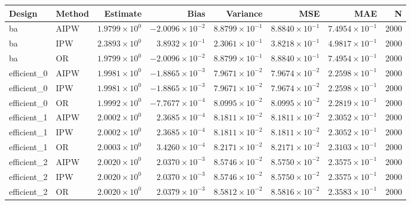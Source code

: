 \begin{table}[ht]
\centering
\begin{tabular}{llrrrrrr}
  \toprule
Design & Method & Estimate & Bias & Variance & MSE & MAE & N \\ 
  \midrule
ba & AIPW & $1.9799 \times 10^{0}$ & $-2.0096 \times 10^{-2}$ & $8.8799 \times 10^{-1}$ & $8.8840 \times 10^{-1}$ & $7.4954 \times 10^{-1}$ & 2000 \\ 
  ba & IPW & $2.3893 \times 10^{0}$ & $3.8932 \times 10^{-1}$ & $2.3061 \times 10^{-1}$ & $3.8218 \times 10^{-1}$ & $4.9817 \times 10^{-1}$ & 2000 \\ 
  ba & OR & $1.9799 \times 10^{0}$ & $-2.0096 \times 10^{-2}$ & $8.8799 \times 10^{-1}$ & $8.8840 \times 10^{-1}$ & $7.4954 \times 10^{-1}$ & 2000 \\ 
   \midrule
efficient\_0 & AIPW & $1.9981 \times 10^{0}$ & $-1.8865 \times 10^{-3}$ & $7.9671 \times 10^{-2}$ & $7.9674 \times 10^{-2}$ & $2.2598 \times 10^{-1}$ & 2000 \\ 
  efficient\_0 & IPW & $1.9981 \times 10^{0}$ & $-1.8865 \times 10^{-3}$ & $7.9671 \times 10^{-2}$ & $7.9674 \times 10^{-2}$ & $2.2598 \times 10^{-1}$ & 2000 \\ 
  efficient\_0 & OR & $1.9992 \times 10^{0}$ & $-7.7677 \times 10^{-4}$ & $8.0995 \times 10^{-2}$ & $8.0995 \times 10^{-2}$ & $2.2819 \times 10^{-1}$ & 2000 \\ 
   \midrule
efficient\_1 & AIPW & $2.0002 \times 10^{0}$ & $2.3685 \times 10^{-4}$ & $8.1811 \times 10^{-2}$ & $8.1811 \times 10^{-2}$ & $2.3052 \times 10^{-1}$ & 2000 \\ 
  efficient\_1 & IPW & $2.0002 \times 10^{0}$ & $2.3685 \times 10^{-4}$ & $8.1811 \times 10^{-2}$ & $8.1811 \times 10^{-2}$ & $2.3052 \times 10^{-1}$ & 2000 \\ 
  efficient\_1 & OR & $2.0003 \times 10^{0}$ & $3.4260 \times 10^{-4}$ & $8.2171 \times 10^{-2}$ & $8.2171 \times 10^{-2}$ & $2.3103 \times 10^{-1}$ & 2000 \\ 
   \midrule
efficient\_2 & AIPW & $2.0020 \times 10^{0}$ & $2.0370 \times 10^{-3}$ & $8.5746 \times 10^{-2}$ & $8.5750 \times 10^{-2}$ & $2.3575 \times 10^{-1}$ & 2000 \\ 
  efficient\_2 & IPW & $2.0020 \times 10^{0}$ & $2.0370 \times 10^{-3}$ & $8.5746 \times 10^{-2}$ & $8.5750 \times 10^{-2}$ & $2.3575 \times 10^{-1}$ & 2000 \\ 
  efficient\_2 & OR & $2.0020 \times 10^{0}$ & $2.0379 \times 10^{-3}$ & $8.5812 \times 10^{-2}$ & $8.5816 \times 10^{-2}$ & $2.3583 \times 10^{-1}$ & 2000 \\ 

\end{tabular}
\end{table}
